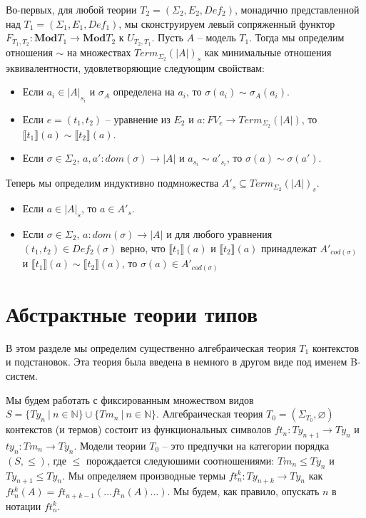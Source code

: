 \documentclass{amsart}
\theoremstyle{definition}
\theoremstyle{remark}
\renewcommand{\ll}{\llbracket}
\newcommand{\rr}{\rrbracket}
\newcommand{\cat}[1]{\mathbf{#1}}
\numberwithin{figure}{section}
\begin{document}
Во-первых, для любой теории $T_2 = (\Sigma_2, E_2, Def_2)$, монадично представленной над $T_1 = (\Sigma_1, E_1, Def_1)$, мы сконструируем левый сопряженный функтор $F_{T_1,T_2} : \cat{Mod}T_1 \to \cat{Mod}T_2$ к $U_{T_2,T_1}$.
Пусть $A$ -- модель $T_1$.
Тогда мы определим отношения $\sim$ на множествах $Term_{\Sigma_2}(|A|)_s$ как минимальные отношения эквивалентности, удовлетворяющие следующим свойствам:
\begin{itemize}
\item Если $a_i \in |A|_{s_i}$ и $\sigma_A$ определена на $a_i$, то $\sigma(a_i) \sim \sigma_A(a_i)$.
\item Если $e = (t_1, t_2)$ -- уравнение из $E_2$ и $a : FV_e \to Term_{\Sigma_2}(|A|)$, то $\ll t_1 \rr(a) \sim \ll t_2 \rr(a)$.
\item Если $\sigma \in \Sigma_2$, $a, a' : dom(\sigma) \to |A|$ и $a_{s_i} \sim a'_{s_i}$, то $\sigma(a) \sim \sigma(a')$.
\end{itemize}
Теперь мы определим индуктивно подмножества $A'_s \subseteq Term_{\Sigma_2}(|A|)_s$.
\begin{itemize}
\item Если $a \in |A|_s$, то $a \in A'_s$.
\item Если $\sigma \in \Sigma_2$, $a : dom(\sigma) \to |A|$ и для любого уравнения $(t_1, t_2) \in Def_2(\sigma)$ верно, что $\ll t_1 \rr(a)$ и $\ll t_2 \rr(a)$ принадлежат $A'_{cod(\sigma)}$ и $\ll t_1 \rr(a) \sim \ll t_2 \rr(a)$, то $\sigma(a) \in A'_{cod(\sigma)}$
\end{itemize}

\section{Абстрактные теории типов}

В этом разделе мы определим существенно алгебраическая теория $T_1$ контекстов и подстановок.
Эта теория была введена в \cite{b-systems} немного в другом виде под именем B-систем.

Мы будем работать с фиксированным множеством видов $S = \{ Ty_n\ |\ n \in \mathbb{N} \} \cup \{ Tm_n\ |\ n \in \mathbb{N} \}$.
Алгебраическая теория $T_0 = (\Sigma_{T_0}, \varnothing)$ контекстов (и термов) состоит из функциональных символов $ft_n : Ty_{n+1} \to Ty_n$ и $ty_n : Tm_n \to Ty_n$.
Модели теории $T_0$ -- это предпучки на категории порядка $(S, \leq)$, где $\leq$ порождается следуюшими соотношениями: $Tm_n \leq Ty_n$ и $Ty_{n+1} \leq Ty_n$.
Мы определяем производные термы $ft^k_n : Ty_{n+k} \to Ty_n$ как $ft^k_n(A) = ft_{n+k-1}( \ldots ft_n(A) \ldots )$.
Мы будем, как правило, опускать $n$ в нотации $ft^k_n$.
\end{document}
